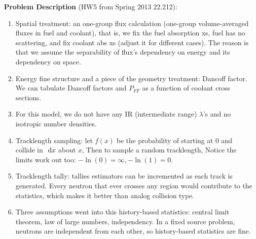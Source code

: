 \documentclass{school-22.211-notes}
\begin{document}
\textbf{Problem Description} (HW5 from Spring 2013 22.212):
\begin{enumerate}
\item Spatial treatment: an one-group flux calculation (one-group volume-averaged fluxes in fuel and coolant), that is, we fix the fuel absorption xs, fuel has no scattering, and fix coolant abs xs (adjust it for different cases). The reason is that we assume the separability of flux's dependency on energy and its dependency on space. 

\item Energy fine structure and a piece of the geometry treatment: Dancoff factor. We can tabulate Dancoff factors and $P_{FF}$ as a function of coolant cross sections. 

\item For this model, we do not have any IR (intermediate range) $\lambda$'s and no isotropic number densities.

\item Tracklength sampling:  let $f(x)$ be the probability of starting at $0$ and collide in $\mbox{ }\mathrm{d} x$ about $x$, 
Then to sample a random tracklength, 
Notice the limits work out too: $-\ln(0) = \infty, -\ln(1) = 0$. 

\item Tracklength tally: tallies estimators can be incremented as each track is generated. Every neutron that ever crosses any region would contribute to the statistics, which makes it better than analog collision type.

\item Three assumptions went into this history-based statistics: central limit theorem, law of large numbers, independency. In a fixed source problem, neutrons are independent from each other, so history-based statistics are fine. 


\end{enumerate}
\end{document}
